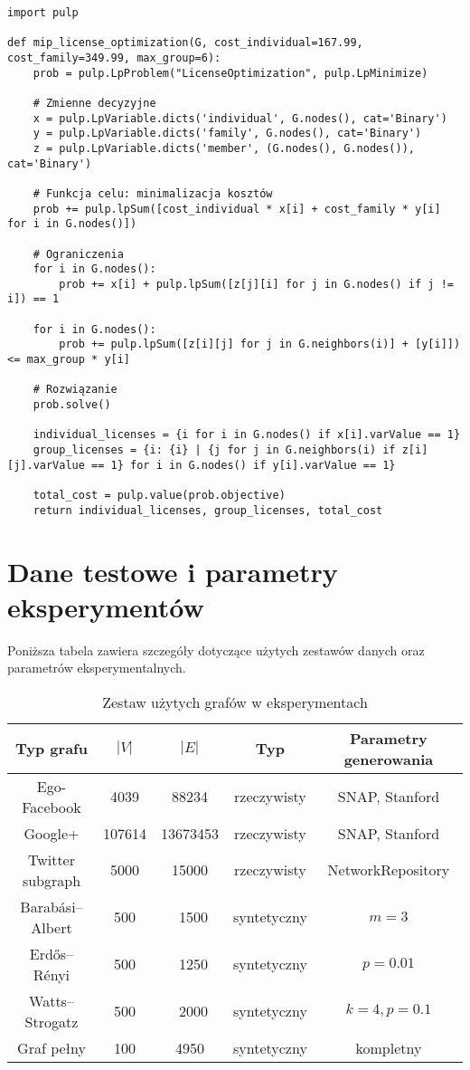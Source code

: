 \begin{verbatim}
import pulp

def mip_license_optimization(G, cost_individual=167.99, cost_family=349.99, max_group=6):
    prob = pulp.LpProblem("LicenseOptimization", pulp.LpMinimize)

    # Zmienne decyzyjne
    x = pulp.LpVariable.dicts('individual', G.nodes(), cat='Binary')
    y = pulp.LpVariable.dicts('family', G.nodes(), cat='Binary')
    z = pulp.LpVariable.dicts('member', (G.nodes(), G.nodes()), cat='Binary')

    # Funkcja celu: minimalizacja kosztów
    prob += pulp.lpSum([cost_individual * x[i] + cost_family * y[i] for i in G.nodes()])

    # Ograniczenia
    for i in G.nodes():
        prob += x[i] + pulp.lpSum([z[j][i] for j in G.nodes() if j != i]) == 1

    for i in G.nodes():
        prob += pulp.lpSum([z[i][j] for j in G.neighbors(i)] + [y[i]]) <= max_group * y[i]

    # Rozwiązanie
    prob.solve()

    individual_licenses = {i for i in G.nodes() if x[i].varValue == 1}
    group_licenses = {i: {i} | {j for j in G.neighbors(i) if z[i][j].varValue == 1} for i in G.nodes() if y[i].varValue == 1}

    total_cost = pulp.value(prob.objective)
    return individual_licenses, group_licenses, total_cost
\end{verbatim}

\section{Dane testowe i parametry eksperymentów}

Poniższa tabela zawiera szczegóły dotyczące użytych zestawów danych oraz parametrów eksperymentalnych.

\begin{table}[h]
\centering
\begin{tabular}{|c|c|c|c|c|}
\hline
\textbf{Typ grafu} & \(|V|\) & \(|E|\) & \textbf{Typ} & \textbf{Parametry generowania} \\
\hline
Ego-Facebook & 4039 & 88234 & rzeczywisty & SNAP, Stanford \\
Google+ & 107614 & 13673453 & rzeczywisty & SNAP, Stanford \\
Twitter subgraph & 5000 & 15000 & rzeczywisty & NetworkRepository \\
Barabási–Albert & 500 & ~1500 & syntetyczny & \(m=3\) \\
Erdős–Rényi & 500 & ~1250 & syntetyczny & \(p=0.01\) \\
Watts–Strogatz & 500 & ~2000 & syntetyczny & \(k=4, p=0.1\) \\
Graf pełny & 100 & 4950 & syntetyczny & kompletny \\
\hline
\end{tabular}
\caption{Zestaw użytych grafów w eksperymentach}
\end{table}

